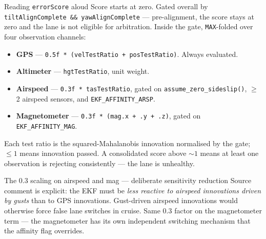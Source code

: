 \documentclass[aspectratio=169,11pt]{beamer}
\begin{document}
\begin{frame}{Reading \texttt{errorScore} aloud}
  Score starts at zero. Gated overall by \texttt{tiltAlignComplete \&\& yawAlignComplete} --- pre-alignment, the score stays at zero and the lane is not eligible for arbitration.
  \vfill
  Inside the gate, \texttt{MAX}-folded over four observation channels:
  \begin{itemize}
    \item \textbf{GPS} --- \texttt{0.5f * (velTestRatio + posTestRatio)}. Always evaluated.
    \item \textbf{Altimeter} --- \texttt{hgtTestRatio}, unit weight.
    \item \textbf{Airspeed} --- \texttt{0.3f * tasTestRatio}, gated on \texttt{assume\_zero\_sideslip()}, $\geq$ 2 airspeed sensors, and \texttt{EKF\_AFFINITY\_ARSP}.
    \item \textbf{Magnetometer} --- \texttt{0.3f * (mag.x + .y + .z)}, gated on \texttt{EKF\_AFFINITY\_MAG}.
  \end{itemize}
  \vfill
  Each test ratio is the squared-Mahalanobis innovation normalised by the gate; $\leq 1$ means innovation passed. A consolidated score above $\sim 1$ means at least one observation is rejecting consistently --- the lane is unhealthy.
\end{frame}

\begin{frame}[allowframebreaks]{The 0.3 scaling on airspeed and mag --- deliberate sensitivity reduction}
  Source comment is explicit: the EKF must be \emph{less reactive to airspeed innovations driven by gusts} than to GPS innovations.
  \vfill
  Gust-driven airspeed innovations would otherwise force false lane switches in cruise.
  \vfill
  Same 0.3 factor on the magnetometer term --- the magnetometer has its own independent switching mechanism that the affinity flag overrides.
\end{frame}
\end{document}

